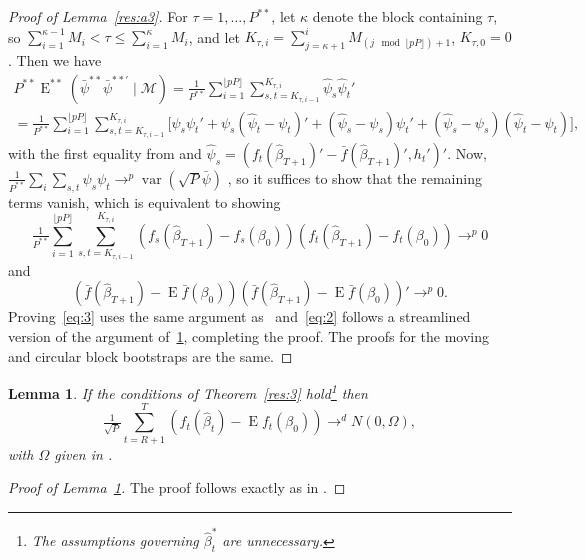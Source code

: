 \documentclass[11pt,fleqn]{article}
\newtheorem{lema}{Lemma}[section]
\theoremstyle{definition}
\DeclareMathOperator{\E}{E}
\DeclareMathOperator{\var}{var}
\begin{document}
\begin{proof}[Proof of Lemma~\ref{res:a3}]
  For $\tau = 1,\dots,P^{**}$, let $\kappa$ denote the block
  containing $\tau$, so $\sum_{i=1}^{\kappa-1} M_i < \tau \leq
  \sum_{i=1}^{\kappa} M_i$, and let $K_{\tau,i} = \sum_{j=\kappa+1}^i
  M_{(j \mod \lfloor p P \rfloor) + 1}$, $K_{\tau,0} = 0$.  Then we have
  \begin{multline}
    P^{**} \E^{**}(\bar{\psi}^{**} \bar{\psi}^{**\prime} \mid \mathcal{M})
    = \tfrac{1}{P^{**}} \sum_{i=1}^{\lfloor p P \rfloor} 
    \sum_{s,t=K_{\tau,i-1}}^{K_{\tau,i}} \hat{\psi}_s \hat{\psi}_t' 
    \\ = \tfrac{1}{P^{**}} \sum_{i=1}^{\lfloor p P \rfloor}
    \sum_{s,t=K_{\tau,i-1}}^{K_{\tau,i}} \big[\psi_s \psi_t' + \psi_s(\hat{\psi}_t
    - \psi_{t})' + (\hat{\psi}_s - \psi_{s}) \psi_{t}' + (\hat{\psi}_s -
    \psi_{s})(\hat{\psi}_t - \psi_{t}) \big],
  \end{multline}
  with the first equality from \citet{Cal:11d} and $\hat{\psi}_s =
  (f_t(\hat{\beta}_{T+1})' - \bar f(\hat{\beta}_{T+1})', h_t')'$.
  Now, $\frac{1}{P^{**}} \sum_i \sum_{s,t} \psi_s \psi_t \to^p \var(\sqrt{P} \bar{\psi})$
  \citep[Lemma~5]{Cal:11d}, so it suffices to show that the remaining
  terms vanish, which is equivalent to showing
  \begin{equation}\label{eq:3}
    \tfrac{1}{P^{**}} \sum_{i=1}^{\lfloor p P \rfloor}\sum_{s,t =
      K_{\tau,i-1}}^{K_{\tau,i}} (f_s(\hat{\beta}_{T+1}) -
    f_s(\beta_0)) (f_t(\hat{\beta}_{T+1}) - f_t(\beta_0))
    \to^p 0
  \end{equation}
  and
  \begin{equation}\label{eq:2}
    (\bar{f}(\hat{\beta}_{T+1}) - \E
    \bar{f}(\beta_0)) (\bar{f}(\hat{\beta}_{T+1}) - \E
    \bar{f}(\beta_0))' \to^p 0.
  \end{equation}
  Proving~\eqref{eq:3} uses the same argument as~\citet[Lemma
  A.3]{Mcc:00} and~\eqref{eq:2} follows a streamlined version of the
  argument of~\ref{res:a5}, completing the proof.  The proofs for the
  moving and circular block bootstraps are the same.
\end{proof}

\begin{lema}\label{res:a5}
  If the conditions of Theorem~\ref{res:3} hold\footnote{The
    assumptions governing $\hat{\beta}_t^{*}$ are unnecessary.} then
  \begin{equation}
    \tfrac{1}{\sqrt{P}} \sum_{t=R+1}^T
    (f_{t}(\hat{\beta}_{t}) - \E f_{t}(\beta_{0})) \to^d N(0, \Omega),
  \end{equation}
  with $\Omega$ given in \citet[Theorem 2.3.1]{Mcc:00}.
\end{lema}
\begin{proof}[Proof of Lemma~\ref{res:a5}]
  The proof follows exactly as in \citet[Theorem 2.3.1]{Mcc:00}.
\end{proof}
\end{document}
